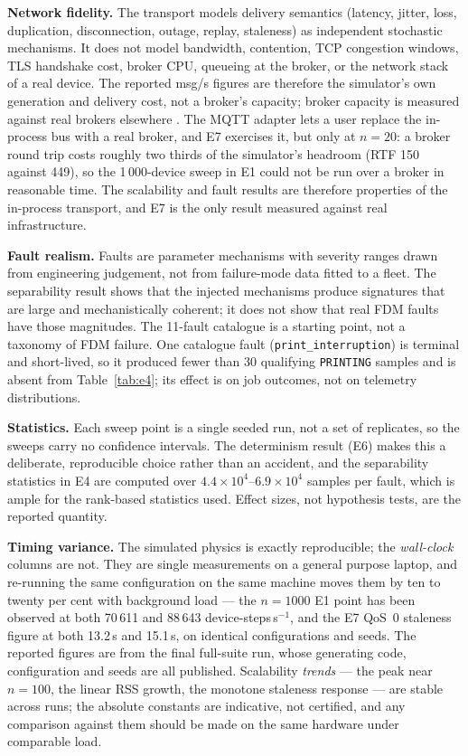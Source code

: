 \documentclass[preprint,12pt,authoryear,nopreprintline]{elsarticle}
\begin{document}
\textbf{Network fidelity.} The transport models delivery semantics
(latency, jitter, loss, duplication, disconnection, outage, replay, staleness)
as independent stochastic mechanisms.
It does not model bandwidth, contention, TCP congestion windows, TLS handshake
cost, broker CPU, queueing at the broker, or the network stack of a real device.
The reported msg/s figures are therefore the simulator's own generation and
delivery cost, not a broker's capacity; broker capacity is measured against real
brokers elsewhere \citep{tonelli2021brokers,martins2021mqttperf}.
The MQTT adapter lets a user replace the in-process bus with a real broker, and
E7 exercises it, but only at $n=20$: a broker round trip costs roughly two thirds
of the simulator's headroom (RTF 150 against 449), so the 1\,000-device sweep in
E1 could not be run over a broker in reasonable time.
The scalability and fault results are therefore properties of the in-process
transport, and E7 is the only result measured against real infrastructure.

\textbf{Fault realism.} Faults are parameter mechanisms with severity ranges
drawn from engineering judgement, not from failure-mode data fitted to a fleet.
The separability result shows that the injected mechanisms produce signatures that
are large and mechanistically coherent; it does not show that real FDM faults have
those magnitudes.
The 11-fault catalogue is a starting point, not a taxonomy of FDM failure.
One catalogue fault (\texttt{print\_interruption}) is terminal and short-lived, so
it produced fewer than 30 qualifying \texttt{PRINTING} samples and is absent from
Table~\ref{tab:e4}; its effect is on job outcomes, not on telemetry
distributions.

\textbf{Statistics.} Each sweep point is a single seeded run, not a set of
replicates, so the sweeps carry no confidence intervals.
The determinism result (E6) makes this a deliberate, reproducible choice rather
than an accident, and the separability statistics in E4 are computed over
$4.4\times10^{4}$--$6.9\times10^{4}$ samples per fault, which is ample for the
rank-based statistics used.
Effect sizes, not hypothesis tests, are the reported quantity.

\textbf{Timing variance.} The simulated physics is exactly reproducible; the
\emph{wall-clock} columns are not. They are single measurements on a general
purpose laptop, and re-running the same configuration on the same machine moves
them by ten to twenty per cent with background load --- the $n=1000$ E1 point has
been observed at both 70\,611 and 88\,643 device-steps\,s$^{-1}$, and the E7
QoS~0 staleness figure at both 13.2\,s and 15.1\,s, on identical
configurations and seeds.
The reported figures are from the final full-suite run, whose generating code,
configuration and seeds are all published.
Scalability \emph{trends} --- the peak near $n=100$, the linear RSS growth, the
monotone staleness response --- are stable across runs; the absolute constants are
indicative, not certified, and any comparison against them should be made on the
same hardware under comparable load.
\end{document}
